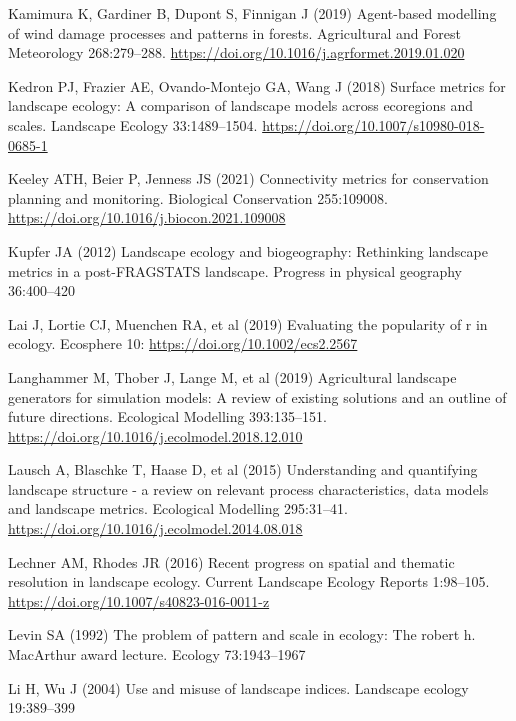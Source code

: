 \documentclass[
  10pt,
  a4paperpaper,
]{article}
\newlength{\cslhangindent}
\newenvironment{CSLReferences}[2] %
 {\begin{list}{}{%
  \setlength{\itemindent}{0pt}
  \setlength{\leftmargin}{0pt}
  \setlength{\parsep}{0pt}
  \ifodd #1
   \setlength{\leftmargin}{\cslhangindent}
   \setlength{\itemindent}{-1\cslhangindent}
  \fi
  \setlength{\itemsep}{#2\baselineskip}}}
 {\end{list}}
\begin{document}
\begin{CSLReferences}{1}{1}
Kamimura K, Gardiner B, Dupont S, Finnigan J (2019) Agent-based
modelling of wind damage processes and patterns in forests. Agricultural
and Forest Meteorology 268:279--288.
\url{https://doi.org/10.1016/j.agrformet.2019.01.020}

Kedron PJ, Frazier AE, Ovando-Montejo GA, Wang J (2018) Surface metrics
for landscape ecology: A comparison of landscape models across
ecoregions and scales. Landscape Ecology 33:1489--1504.
\url{https://doi.org/10.1007/s10980-018-0685-1}

Keeley ATH, Beier P, Jenness JS (2021) Connectivity metrics for
conservation planning and monitoring. Biological Conservation
255:109008. \url{https://doi.org/10.1016/j.biocon.2021.109008}

Kupfer JA (2012) Landscape ecology and biogeography: Rethinking
landscape metrics in a post-FRAGSTATS landscape. Progress in physical
geography 36:400--420

Lai J, Lortie CJ, Muenchen RA, et al (2019) Evaluating the popularity of
r in ecology. Ecosphere 10: \url{https://doi.org/10.1002/ecs2.2567}

Langhammer M, Thober J, Lange M, et al (2019) Agricultural landscape
generators for simulation models: A review of existing solutions and an
outline of future directions. Ecological Modelling 393:135--151.
\url{https://doi.org/10.1016/j.ecolmodel.2018.12.010}

Lausch A, Blaschke T, Haase D, et al (2015) Understanding and
quantifying landscape structure - a review on relevant process
characteristics, data models and landscape metrics. Ecological Modelling
295:31--41. \url{https://doi.org/10.1016/j.ecolmodel.2014.08.018}

Lechner AM, Rhodes JR (2016) Recent progress on spatial and thematic
resolution in landscape ecology. Current Landscape Ecology Reports
1:98--105. \url{https://doi.org/10.1007/s40823-016-0011-z}

Levin SA (1992) The problem of pattern and scale in ecology: The robert
h. MacArthur award lecture. Ecology 73:1943--1967

Li H, Wu J (2004) Use and misuse of landscape indices. Landscape ecology
19:389--399


\end{CSLReferences}
\end{document}
